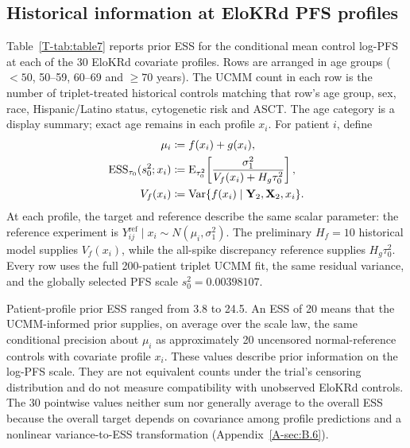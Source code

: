 \documentclass[11pt]{article}
\begin{document}
\subsection{Historical information at EloKRd PFS profiles}
Table~\ref{T-tab:table7} reports prior ESS for the conditional mean control log-PFS at each of the 30 EloKRd covariate profiles. Rows are arranged in age groups ($<50$, 50--59, 60--69 and $\geq70$ years). The UCMM count in each row is the number of triplet-treated historical controls matching that row's age group, sex, race, Hispanic/Latino status, cytogenetic risk and ASCT. The age category is a display summary; exact age remains in each profile $x_i$. For patient $i$, define
\begin{equation}\label{eq:profile}
\begin{aligned}
\mu_i&\coloneqq f(x_i)+g(x_i),\\
\operatorname{ESS}_{\tau_0}(s_0^2;x_i)&\coloneqq
\operatorname{E}_{\tau_0^2}\!\left[
\frac{\sigma_1^2}{V_f(x_i)+H_g\tau_0^2}
\right],\\
V_f(x_i)&\coloneqq
\operatorname{Var}\{f(x_i)\mid\mathbf Y_2,\mathbf X_2,x_i\}.
\end{aligned}
\end{equation}
At each profile, the target and reference describe the same scalar parameter: the reference experiment is $Y_{ij}^{\mathrm{ref}}\mid x_i\sim N(\mu_i,\sigma_1^2)$. The preliminary $H_f=10$ historical model supplies $V_f(x_i)$, while the all-spike discrepancy reference supplies $H_g\tau_0^2$. Every row uses the full 200-patient triplet UCMM fit, the same residual variance, and the globally selected PFS scale $s_0^2=0.00398107$.

Patient-profile prior ESS ranged from 3.8 to 24.5. An ESS of 20 means that the UCMM-informed prior supplies, on average over the scale law, the same conditional precision about $\mu_i$ as approximately 20 uncensored normal-reference controls with covariate profile $x_i$. These values describe prior information on the log-PFS scale. They are not equivalent counts under the trial's censoring distribution and do not measure compatibility with unobserved EloKRd controls. The 30 pointwise values neither sum nor generally average to the overall ESS because the overall target depends on covariance among profile predictions and a nonlinear variance-to-ESS transformation (Appendix~\ref{A-sec:B.6}).
\end{document}
